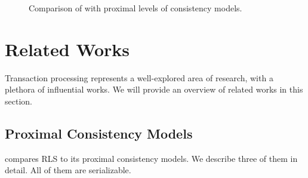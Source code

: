 \begin{figure}[t]
	\centering
	\hfill
    \hfill
	\caption{Comparison of \xxcons with proximal levels of consistency models.}
\end{figure}

\section{Related Works}\label{sec:related}
Transaction processing represents a well-explored area of research, with a plethora of influential works. We will provide an overview of related works in this section.

\subsection{Proximal Consistency Models}\label{sec:rls:compare}

 compares RLS to its proximal consistency models. We describe three of them in detail. All of them are serializable.

